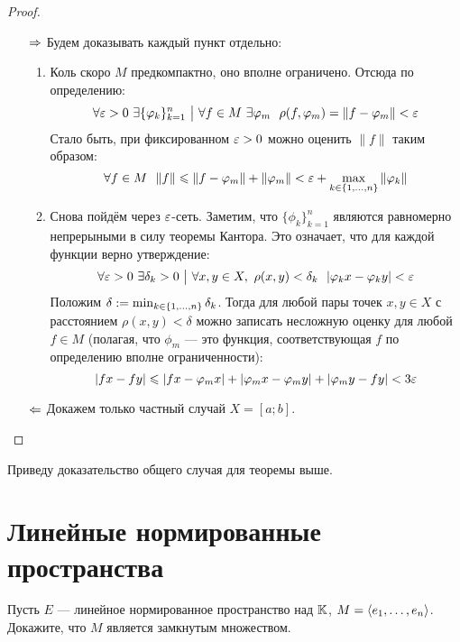 \begin{proof}~
	\begin{itemize}
		\item[$\Rightarrow$] Будем доказывать каждый пункт отдельно:
		\begin{enumerate}
			\item Коль скоро $M$ предкомпактно, оно вполне ограничено. Отсюда по определению:
			\[
				\forall \varepsilon > 0\ \exists \{\varphi_k\}_{k = 1}^n \ \big|\  \forall f \in M\ \exists \varphi_m\ \ \rho(f, \varphi_m) = \|f - \varphi_m\| < \varepsilon
			\]
			Стало быть, при фиксированном $\varepsilon > 0$ можно оценить $\|f\|$ таким образом:
			\[
				\forall f \in M\ \ \|f\| \leqslant \|f - \varphi_m\| + \|\varphi_m\| < \varepsilon + \max_{k \in \{1, \ldots, n\}} \|\varphi_k\|
			\]
			
			\item Снова пойдём через $\varepsilon$-сеть. Заметим, что $\{\phi_k\}_{k = 1}^n$ являются равномерно непрерыными в силу теоремы Кантора. Это означает, что для каждой функции верно утверждение:
			\[
				\forall \varepsilon > 0\ \exists \delta_k > 0 \ \big|\  \forall x, y \in X,\ \rho(x, y) < \delta_k\ \ |\varphi_kx - \varphi_ky| < \varepsilon
			\]
			Положим $\delta := \min_{k \in \{1, \ldots, n\}} \delta_k$. Тогда для любой пары точек $x, y \in X$ с расстоянием $\rho(x, y) < \delta$ можно записать несложную оценку для любой $f \in M$ (полагая, что $\phi_m$ --- это функция, соответствующая $f$ по определению вполне ограниченности):
			\[
				|fx - fy| \leqslant |fx - \varphi_m x| + |\varphi_m x - \varphi_m y| + |\varphi_m y - fy| < 3\varepsilon
			\]
		\end{enumerate}
		
		\item[$\Leftarrow$] Докажем только частный случай $X = [a; b]$. 
	\end{itemize}
\end{proof}

\begin{anote}
	Приведу доказательство общего случая для теоремы выше.
\end{anote}

\section{Линейные нормированные пространства}

\begin{exercise}
	Пусть $E$ --- линейное нормированное пространство над $\mathbb{K}$, $M = \left\langle e_1, \ldots, e_n\right\rangle$. Докажите, что $M$ является замкнутым множеством.
\end{exercise}